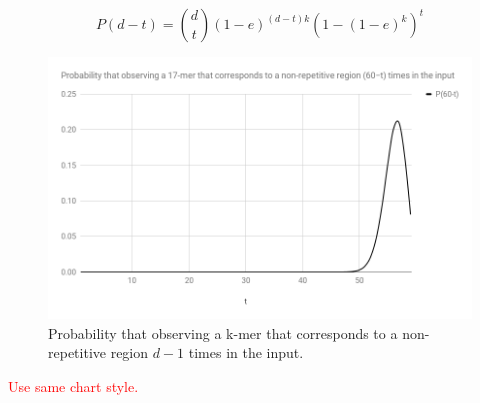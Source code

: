 \documentclass[11pt]{article}
\newcommand\myworries[1]{\textcolor{red}{#1}}
\begin{document}
 $$P(d-t) = {d \choose t} (1-e)^{(d-t)k} (1-(1-e)^k)^t$$

\begin{figure}
    \centering
    \includegraphics[scale=0.50]{image/chart.png}
    \caption{Probability that observing a k-mer that corresponds to a non-repetitive region $d-1$ times in the input.}
    \label{fig:chart}
\end{figure}
\myworries{Use same chart style.}
%
\end{document}
